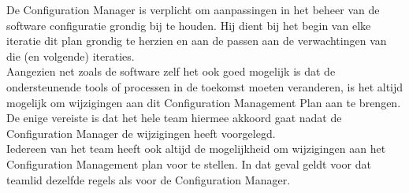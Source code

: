 De Configuration Manager is verplicht om aanpassingen in het beheer van de software configuratie grondig bij te houden. Hij dient bij het begin van elke iteratie dit plan grondig te herzien en aan de passen aan de verwachtingen van die (en volgende) iteraties.\\

Aangezien net zoals de software zelf het ook goed mogelijk is dat de ondersteunende tools of processen in de toekomst moeten veranderen, is het altijd mogelijk om wijzigingen aan dit Configuration Management Plan aan te brengen. De enige vereiste is dat het hele team hiermee akkoord gaat nadat de Configuration Manager de wijzigingen heeft voorgelegd. \\

Iedereen van het team heeft ook altijd de mogelijkheid om wijzigingen aan het Configuration Management plan voor te stellen. In dat geval geldt voor dat teamlid dezelfde regels als voor de Configuration Manager.